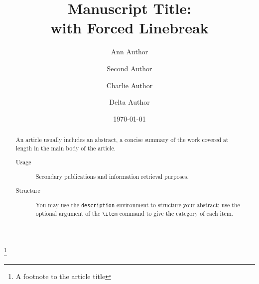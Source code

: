 \documentclass[%
 reprint,
 amsmath,amssymb,
 aps,
]{revtex4-2}
\begin{document}

\title{Manuscript Title:\\with Forced Linebreak}%
\thanks{A footnote to the article title}%

\author{Ann Author}
\author{Second Author}%
%


\author{Charlie Author}
%
%
\author{Delta Author}
%


\date{\today}%

\begin{abstract}
An article usually includes an abstract, a concise summary of the work
covered at length in the main body of the article. 
\begin{description}
\item[Usage]
Secondary publications and information retrieval purposes.
\item[Structure]
You may use the \texttt{description} environment to structure your abstract;
use the optional argument of the \verb+\item+ command to give the category of each item. 
\end{description}
\end{abstract}

\maketitle
\end{document}
